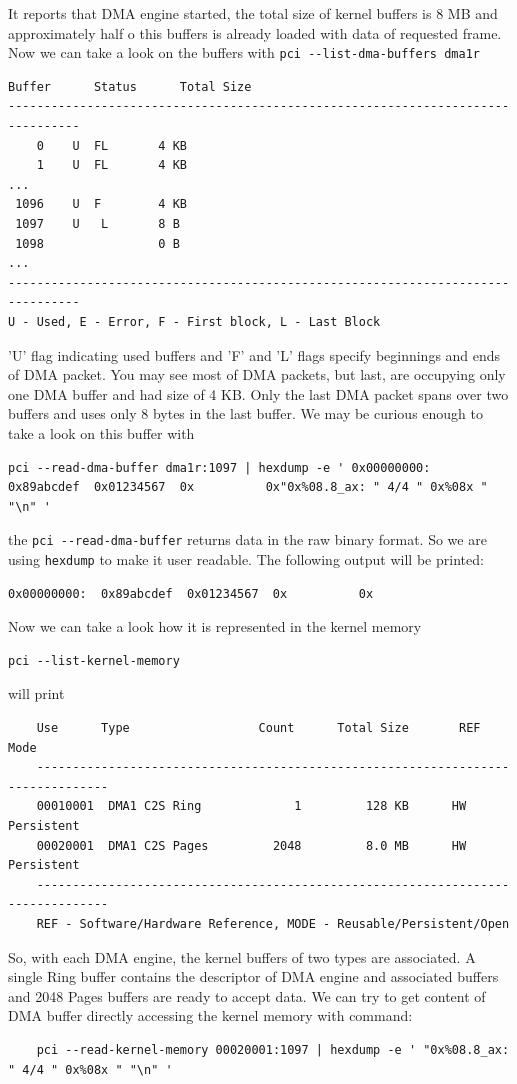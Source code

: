It reports that DMA engine started, the total size of kernel buffers is 8 MB and approximately half o this buffers is already loaded with data of requested frame. Now we can take a look on the buffers with \verb/pci --list-dma-buffers dma1r/
\begin{verbatim}
Buffer      Status      Total Size         
--------------------------------------------------------------------------------
    0    U  FL       4 KB
    1    U  FL       4 KB
...
 1096    U  F        4 KB
 1097    U   L       8 B 
 1098                0 B 
...
--------------------------------------------------------------------------------
U - Used, E - Error, F - First block, L - Last Block
\end{verbatim}
'U' flag indicating used buffers and 'F' and 'L' flags specify beginnings and ends of DMA packet.  You may see most of DMA packets, but last, are occupying only one DMA buffer and had size of 4 KB. Only the last DMA packet spans over two buffers and uses only 8 bytes in the last buffer. We may be curious enough to take a look on this buffer with 
\begin{verbatim}
pci --read-dma-buffer dma1r:1097 | hexdump -e ' 0x00000000:  0x89abcdef  0x01234567  0x          0x"0x%08.8_ax: " 4/4 " 0x%08x " "\n" '
\end{verbatim}
the \verb/pci --read-dma-buffer/ returns data in the raw binary format. So we are using \verb/hexdump/ to make it user readable. The following output will be printed:
\begin{verbatim}
0x00000000:  0x89abcdef  0x01234567  0x          0x
\end{verbatim}


Now we can take a look how it is represented in the kernel memory
\begin{verbatim}
pci --list-kernel-memory
\end{verbatim}

will print
\begin{verbatim}
	Use      Type                  Count      Total Size       REF       Mode 
	--------------------------------------------------------------------------------
	00010001  DMA1 C2S Ring             1         128 KB      HW         Persistent
	00020001  DMA1 C2S Pages         2048         8.0 MB      HW         Persistent
	--------------------------------------------------------------------------------
	REF - Software/Hardware Reference, MODE - Reusable/Persistent/Open
\end{verbatim}

So, with each DMA engine, the kernel buffers of two types are associated. A single Ring buffer contains the descriptor of DMA engine and associated buffers and 2048 Pages buffers are ready to accept data. We can try to get content of DMA buffer directly accessing the kernel memory with command:
\begin{verbatim}
	pci --read-kernel-memory 00020001:1097 | hexdump -e ' "0x%08.8_ax: " 4/4 " 0x%08x " "\n" '
\end{verbatim}

